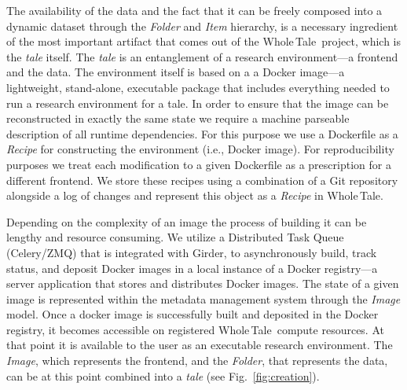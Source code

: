 \documentclass[review]{elsarticle}
\newcommand{\wt}{Whole\,Tale}
\begin{document}
The availability of the data and the fact that it can be freely composed 
into a dynamic dataset through the \emph{Folder} and \emph{Item} hierarchy,
is a necessary ingredient of the most important artifact that comes out of the
\wt\ project, which is the \emph{tale} itself. The \emph{tale} is an
entanglement of a research environment---a frontend and the data. 
The environment itself is based on a a Docker image---a
lightweight, stand-alone, executable package that includes
everything needed to run a research environment for a tale.
In order to ensure that the image can be reconstructed in 
exactly the same state we require a machine
parseable description of all runtime dependencies. 
For this purpose we use a Dockerfile
as a \emph{Recipe} for constructing the environment (i.e., Docker image). 
For reproducibility purposes we treat each modification
to a given Dockerfile as a prescription for a different frontend.
We store these recipes using a combination of a Git repository alongside
a log of changes and represent this object as a
\emph{Recipe} in \wt. 

Depending on the complexity of an image the process of building it
can be lengthy and resource consuming. We utilize a Distributed Task Queue
(Celery/ZMQ) that is integrated with Girder, to asynchronously build, track
status, and deposit Docker images in a local instance of a Docker registry---a
server application that stores and distributes Docker images. The state of a
given image is represented within the metadata management system through the
\emph{Image} model. Once a docker image is successfully built and deposited
in the Docker registry, it becomes accessible on registered \wt\ compute resources. At that point it is
available to the user as an executable research environment. The \emph{Image}, which represents the frontend, and the \emph{Folder}, that represents the data, can be at this point combined into a \emph{tale} (see Fig.~\ref{fig:creation}).
\end{document}
